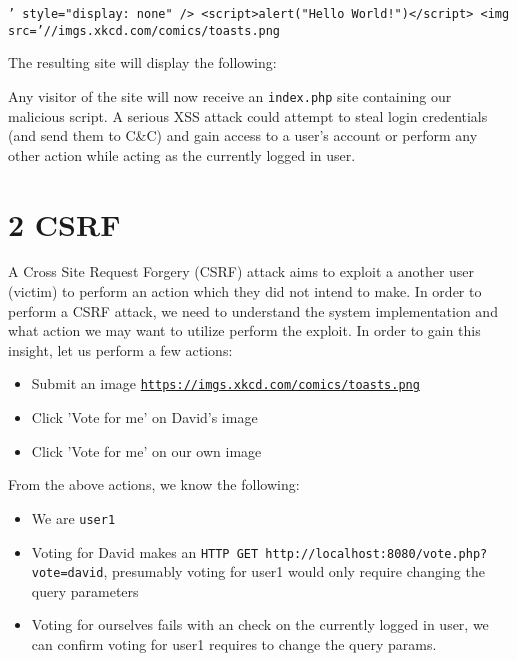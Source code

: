 \documentclass[a4paper, 12pt]{article}
\begin{document}
\texttt{\linebreak' style="display: none" />
\linebreak<script>alert("Hello World!")</script>
\linebreak<img src='//imgs.xkcd.com/comics/toasts.png
}
\linebreak

The resulting site will display the following:



Any visitor of the site will now receive an \texttt{index.php} site containing our malicious script. A serious XSS attack could attempt to steal login credentials (and send them to C\&C) and gain access to a user's account or perform any other action while acting as the currently logged in user.

\section*{2 CSRF}
A Cross Site Request Forgery (CSRF) attack aims to exploit a another user (victim) to perform an action which they did not intend to make. In order to perform a CSRF attack, we need to understand the system implementation and what action we may want to utilize perform the exploit. In order to gain this insight, let us perform a few actions:

\begin{itemize}
	\item Submit an image \texttt{\url{https://imgs.xkcd.com/comics/toasts.png}}
    \item Click 'Vote for me' on David's image
    \item Click 'Vote for me' on our own image
\end{itemize}

From the above actions, we know the following:
\begin{itemize}
	\item We are \texttt{user1}
	\item Voting for David makes an \texttt{HTTP GET http://localhost:8080/vote.php?vote=david}, presumably voting for user1 would only require changing the query parameters
    \item Voting for ourselves fails with an check on the currently logged in user, we can confirm voting for user1 requires to change the query params.
\end{itemize}
\end{document}
